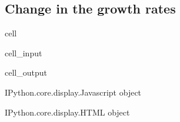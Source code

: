 \documentclass[letterpaper,10pt,english]{jupyterBook}
\begin{document}
\subsection{Change in the growth rates}
\label{\detokenize{content/05_SimpleModel/SimpleModel:change-in-the-growth-rates}}
\begin{sphinxuseclass}{cell}\begin{sphinxVerbatimInput}

\begin{sphinxuseclass}{cell_input}
\begin{sphinxVerbatim}[commandchars=\\\{\}]
\PYG{p}{[}\PYG{p}{]}
\end{sphinxVerbatim}

\end{sphinxuseclass}\end{sphinxVerbatimInput}
\begin{sphinxVerbatimOutput}

\begin{sphinxuseclass}{cell_output}
\begin{sphinxVerbatim}[commandchars=\\\{\}]
\PYGZlt{}IPython.core.display.Javascript object\PYGZgt{}
\end{sphinxVerbatim}

\begin{sphinxVerbatim}[commandchars=\\\{\}]
\PYGZlt{}IPython.core.display.HTML object\PYGZgt{}
\end{sphinxVerbatim}

\end{sphinxuseclass}\end{sphinxVerbatimOutput}

\end{sphinxuseclass}
\end{document}
